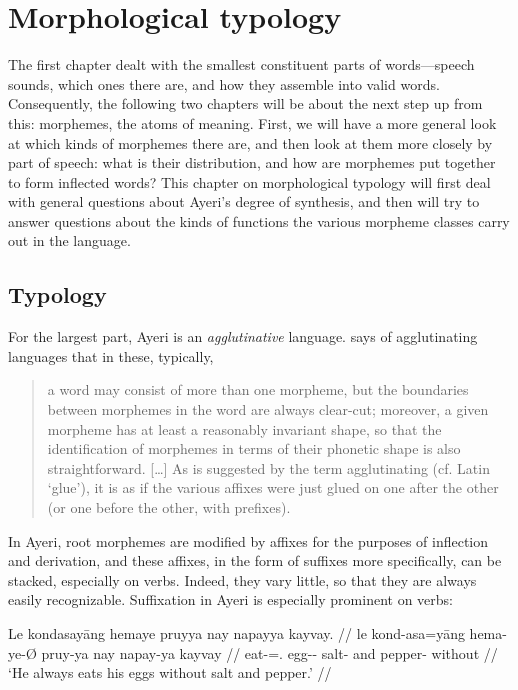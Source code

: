 
\chapter{Morphological typology}
\label{ch:morphtyp}

The first chapter dealt with the smallest constituent parts of words---speech 
sounds, which ones there are, and how they assemble into valid words. 
Consequently, the following two chapters will be about the next step up from 
this: morphemes, the atoms of meaning. First, we will have a more general look 
at which kinds of morphemes there are, and then look at them more closely by 
part of speech: what is their distribution, and how are morphemes put together 
to form inflected words? This chapter on morphological typology will first 
deal with general questions about Ayeri's degree of synthesis, and then will
try to answer questions about the kinds of functions the various morpheme
classes carry out in the language.

\section{Typology}
\label{sec:typology}

For the largest part, Ayeri is an \emph{agglutinative} 
language. \citet{comrie1989} says of agglutinating languages that in these, 
typically,

\blockcquote[43--44]{comrie1989}{a word may consist of more than one morpheme,
but the boundaries between morphemes in the word are always clear-cut;
moreover, a given morpheme has at least a reasonably invariant shape, so that
the identification of morphemes in terms of their phonetic shape is also
straightforward. […] As is suggested by the term agglutinating (cf. Latin
 `glue'), it is as if the various affixes were just glued on one 
after the other (or one before the other, with prefixes).}

In Ayeri, root morphemes are modified by affixes for the purposes of inflection
and derivation, and these affixes, in the form of suffixes more
specifically, can be stacked, especially on verbs. Indeed, they vary little, so
that they are always easily recognizable. Suffixation in Ayeri is especially
prominent on verbs:

\ex\begingl
	\gla Le kondasayāng hemaye pruyya nay napayya kayvay. //
	\glb le kond-asa=yāng hema-ye-Ø pruy-ya nay napay-ya kayvay //
	\glc \PatTI{} eat-\Hab{}=\TsgM{}.\Aarg{} egg-\Pl{}-\Top{} salt-\Loc{} 
		and pepper-\Loc{} without //
	\glft `He always eats his eggs without salt and pepper.' //
\endgl\xe


